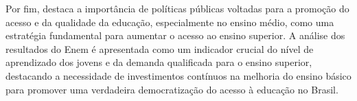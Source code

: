 Por fim, \cite{de2012acesso} destaca a importância de políticas públicas voltadas para a promoção do acesso e da qualidade da educação, especialmente no ensino médio, como uma estratégia fundamental para aumentar o acesso ao ensino superior. A análise dos resultados do Enem é apresentada como um indicador crucial do nível de aprendizado dos jovens e da demanda qualificada para o ensino superior, destacando a necessidade de investimentos contínuos na melhoria do ensino básico para promover uma verdadeira democratização do acesso à educação no Brasil.
